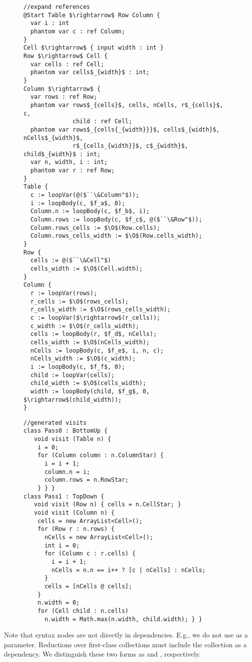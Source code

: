 \begin{figure}
\begin{lstlisting}[mathescape]
//expand references
@Start Table $\rightarrow$ Row Column { 
  var i : int 
  phantom var c : ref Column;
}
Cell $\rightarrow$ { input width : int }
Row $\rightarrow$ Cell { 
  var cells : ref Cell;
  phantom var cells$_{width}$ : int;
}
Column $\rightarrow$ {   
  var rows : ref Row;
  phantom var rows$_{cells}$, cells, nCells, r$_{cells}$, c, 
              child : ref Cell;
  phantom var rows$_{cells{_{width}}}$, cells$_{width}$, nCells$_{width}$, 
              r$_{cells_{width}}$, c$_{width}$, child$_{width}$ : int;
  var n, width, i : int;
  phantom var r : ref Row;
}
Table {
  c := loopVar(@($``\&Column"$));
  i := loopBody(c, $f_a$, 0);
  Column.n := loopBody(c, $f_b$, i);
  Column.rows := loopBody(c, $f_c$, @($``\&Row"$));
  Column.rows_cells := $\O$(Row.cells);
  Column.rows_cells_width := $\O$(Row.cells_width);
}
Row { 
  cells := @($``\&Cell"$) 
  cells_width := $\O$(Cell.width);
}
Column { 
  r := loopVar(rows);
  r_cells := $\O$(rows_cells);
  r_cells_width := $\O$(rows_cells_width);  
  c := loopVar($\rightarrow$(r_cells));
  c_width := $\O$(r_cells_width);  
  cells := loopBody(r, $f_d$, nCells);
  cells_width := $\O$(nCells_width);
  nCells := loopBody(c, $f_e$, i, n, c);
  nCells_width := $\O$(c_width);
  i := loopBody(c, $f_f$, 0);
  child := loopVar(cells);
  child_width := $\O$(cells_width);
  width := loopBody(child, $f_g$, 0, $\rightarrow$(child_width));  
}
\end{lstlisting}

\begin{lstlisting}[mathescape]
//generated visits
class Pass0 : BottomUp {
   void visit (Table n) { 
    i = 0;
    for (Column column : n.ColumnStar) {
      i = i + 1;
      column.n = i;
      column.rows = n.RowStar;
    } } }
class Pass1 : TopDown {
   void visit (Row n) { cells = n.CellStar; }
   void visit (Column n) {
    cells = new ArrayList<Cell>();
    for (Row r : n.rows) {
      nCells = new ArrayList<Cell>();
      int i = 0;
      for (Column c : r.cells) {
        i = i + 1;
        nCells = n.n == i++ ? [c | nCells] : nCells;        
      }
      cells = [nCells @ cells];
    }
    n.width = 0;
    for (Cell child : n.cells)
      n.width = Math.max(n.width, child.width); } }
\end{lstlisting}
\end{figure}


Note that syntax nodes are not directly in dependencies. E.g., we do not use  as a parameter. Reductions over first-class collections must include the collection as a dependency. We distinguish these two forms as  and , respectively.


